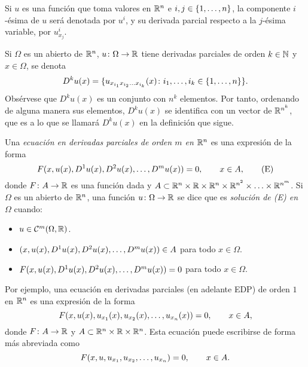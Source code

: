 \documentclass[a4paper, 12pt, extrafontsizes]{memoir}
\begin{document}
Si $u$ es una función que toma valores en $\mathbb R^n$ e $i,j \in \{1,\mathellipsis,n\}$, la componente $i$-ésima de $u$ será denotada por $u^i$, y su derivada parcial respecto a la $j$-ésima variable, por $u^i_{x_j}$.

Si $\Omega$ es un abierto de $\mathbb R^n$, $u \colon \Omega \to \mathbb R$ tiene derivadas parciales de orden $k \in \mathbb N$ y $x \in \Omega$, se denota
\[D^ku(x) = \{u_{x_{i_1}x_{i_2}\mathellipsis x_{i_k}}(x) \colon i_1,\mathellipsis,i_k \in \{1,\mathellipsis,n\}\}.\]
Obsérvese que $D^ku(x)$ es un conjunto con $n^k$ elementos. Por tanto, ordenando de alguna manera sus elementos, $D^ku(x)$ se identifica con un vector de $\mathbb R^{n^k}$, que es a lo que se llamará $D^ku(x)$ en la definición que sigue.

\begin{definition}
    Una \emph{ecuación en derivadas parciales de orden $m$ en $\mathbb R^n$} es una expresión de la forma
    \[F(x,u(x),D^1u(x),D^2u(x),\mathellipsis,D^mu(x)) = 0, \qquad x \in A, \tag{E}\]
    donde $F \colon A \to \mathbb R$ es una función dada y $A \subset \mathbb R^n \times \mathbb R \times \mathbb R^n \times \mathbb R^{n^2} \times \mathellipsis \times \mathbb R^{n^m}$. Si $\Omega$ es un abierto de $\mathbb R^n$, una función $u \colon \Omega \to \mathbb R$ se dice que es \emph{solución de \textup{(E)} en $\Omega$} cuando:
    \begin{itemize}
        \item $u \in \mathcal{C}^m(\Omega,\mathbb R)$.
        \item $(x,u(x),D^1u(x),D^2u(x),\mathellipsis,D^mu(x)) \in A$ para todo $x \in \Omega$.
        \item $F(x,u(x),D^1u(x),D^2u(x),\mathellipsis,D^mu(x) )=0$ para todo $x \in \Omega$.
    \end{itemize}
\end{definition}

Por ejemplo, una ecuación en derivadas parciales (en adelante EDP) de orden $1$ en $\mathbb R^n$ es una expresión de la forma
\[F(x,u(x),u_{x_1}(x),u_{x_2}(x),\mathellipsis,u_{x_n}(x)) = 0, \qquad x \in A,\]
donde $F \colon A \to \mathbb R$ y $A \subset \mathbb R^n \times \mathbb R \times \mathbb R^n$. Esta ecuación puede escribirse de forma más abreviada como
\[F(x,u,u_{x_1},u_{x_2},\mathellipsis,u_{x_n}) = 0, \qquad x \in A.\]
\end{document}
